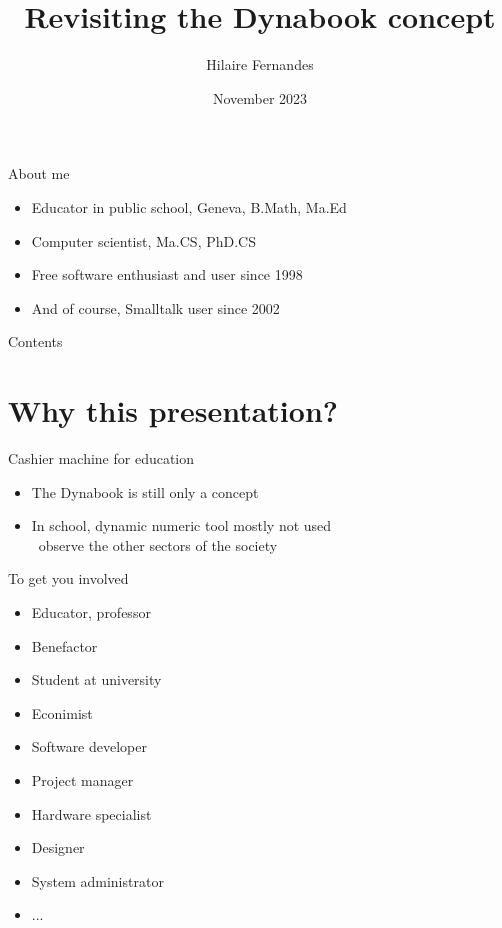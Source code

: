 \documentclass{beamer}
\title{Revisiting the Dynabook concept}
\author{Hilaire Fernandes}
\institute[DIP, Geneva]{Department of Public Instruction \\ Geneva}
\date{November 2023}
\newcommand{\tip}{\boldmath{\textcolor{red}{$\Rightarrow$}}}
\begin{document}
\begin{frame}
  \titlepage
\end{frame}
%
\begin{frame}{About me}
  \fontsize{12pt}{30pt}\selectfont
  \begin{itemize}
  \item Educator in public school, Geneva, B.Math, Ma.Ed
  \item Computer scientist, Ma.CS, PhD.CS
  \item Free software enthusiast and user since 1998
  \item And of course, Smalltalk user since 2002
  \end{itemize}
\end{frame}
%
\begin{frame}{Contents}
  \tableofcontents[hideallsubsections]
\end{frame}

\section{Why this presentation?}

\begin{frame}{Cashier machine for education}
  \begin{itemize}
  \item The Dynabook is still only a concept
  \item In school, dynamic numeric tool mostly not used\\
    \tip\ observe the other sectors of the society
\end{itemize}
\end{frame}
%
\begin{frame}{To get you involved}
  \begin{itemize}
  \item Educator, professor
  \item Benefactor
  \item Student at university
  \item Econimist
  \item Software developer
  \item Project manager
  \item Hardware specialist
  \item Designer
  \item System administrator
  \item ...
  \end{itemize}
\end{frame}
\end{document}
